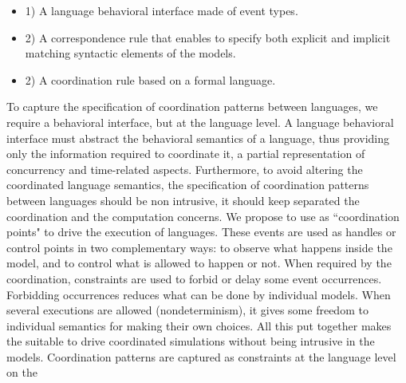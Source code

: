 \begin{itemize}
	\item 1) A language behavioral interface made of event types. 
	\item 2) A correspondence rule that enables to specify both explicit and implicit matching syntactic elements of the models. 
	\item 2) A coordination rule based on a formal language. 
\end{itemize} 

To capture the specification of coordination patterns between languages, we require a behavioral interface, but at the language level. A language behavioral interface must abstract the behavioral semantics of a language, thus providing only the information required to coordinate it, \ie a partial representation of concurrency and time-related aspects. 
Furthermore, to avoid altering the coordinated language semantics, the specification of coordination patterns between languages should be non intrusive, \ie it should keep separated the coordination and the computation concerns. We propose to use \dse as ``coordination points" to drive the execution of languages. These events are used as handles or control points in two complementary ways: to observe what happens inside the model, and to control what is allowed to happen or not. When required by the coordination, constraints are used to forbid or delay some event occurrences. Forbidding occurrences reduces what can be done by individual models. When several executions are allowed
(nondeterminism), it gives some freedom to individual semantics for making their own choices. All this put together makes the \dse suitable to drive coordinated simulations without being intrusive in the models. Coordination patterns are captured as constraints at the language level on the \dse


